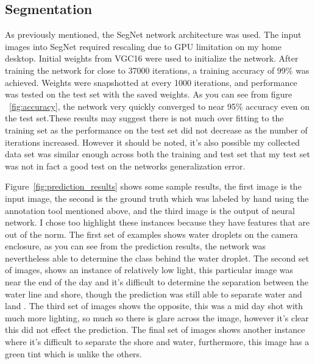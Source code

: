 \documentclass[10pt,twocolumn,letterpaper]{article}
\begin{document}
\subsection{Segmentation}
As previously mentioned, the SegNet network architecture was used. The input images into SegNet required rescaling due to GPU limitation on my home desktop. Initial weights from VGC16 were used to initialize the network. After training the network for close to 37000 iterations, a training accuracy of 99\% was achieved. Weights were snapshotted at every 1000 iterations, and
performance was tested on the test set with the saved weights. As you can see from figure ~\ref{fig:accuracy}, the network very quickly converged to near 95\% accuracy even on the test set.These results may suggest there is not much over fitting to the training set as the performance on the test set did not decrease as the number of iterations increased. However it should be noted, it's also possible my collected data set was similar enough across both the training and test set that my test set was not in fact a good test on the networks generalization error.

Figure~\ref{fig:prediction_results} shows some sample results, the first image is the input image, the second is the ground truth which was labeled by hand using the annotation tool mentioned above, and the third image is the output of neural network.
I chose too highlight these instances because they have features that are out of the norm. The first set of examples shows water droplets on the camera enclosure, as you can see from the prediction results, the network was nevertheless able to determine the class behind the water droplet. The second set of images, shows an instance of relatively low light, this particular image was near the end of the day and it's difficult to determine the separation between the water line and shore, though the prediction was still able to separate water and land . The third set of images shows the opposite, this was a mid day shot with much more lighting, so much so there is glare across the image, however it's clear this did not effect the prediction. The final set of images shows another instance where it's difficult to separate the shore and water, furthermore, this image has a green tint which is unlike the others.

\begin{table}[pt]
\begin{center}
 \caption{Forward and backwards times measured using the caffe time command over 10 iterations with a batch size of 1, and memory usage found using the nvidia-smi command  }
 \end{center}
\label{tab:time}
\end{table}
\end{document}
